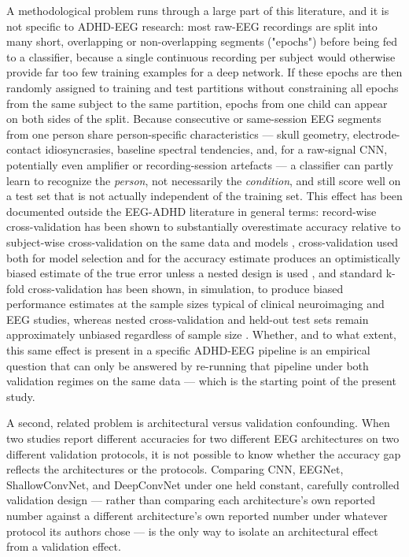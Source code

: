 \documentclass[a4paper,fleqn]{cas-sc}
\begin{document}
A methodological problem runs through a large part of this literature, and it is not specific to ADHD-EEG research: most raw-EEG recordings are split into many short, overlapping or non-overlapping segments ("epochs") before being fed to a classifier, because a single continuous recording per subject would otherwise provide far too few training examples for a deep network. If these epochs are then randomly assigned to training and test partitions without constraining all epochs from the same subject to the same partition, epochs from one child can appear on both sides of the split. Because consecutive or same-session EEG segments from one person share person-specific characteristics --- skull geometry, electrode-contact idiosyncrasies, baseline spectral tendencies, and, for a raw-signal CNN, potentially even amplifier or recording-session artefacts --- a classifier can partly learn to recognize the \textit{person}, not necessarily the \textit{condition}, and still score well on a test set that is not actually independent of the training set. This effect has been documented outside the EEG-ADHD literature in general terms: record-wise cross-validation has been shown to substantially overestimate accuracy relative to subject-wise cross-validation on the same data and models \cite{saeb2017need}, cross-validation used both for model selection and for the accuracy estimate produces an optimistically biased estimate of the true error unless a nested design is used \cite{varma2006bias}, and standard k-fold cross-validation has been shown, in simulation, to produce biased performance estimates at the sample sizes typical of clinical neuroimaging and EEG studies, whereas nested cross-validation and held-out test sets remain approximately unbiased regardless of sample size \cite{vabalas2019machine}. Whether, and to what extent, this same effect is present in a specific ADHD-EEG pipeline is an empirical question that can only be answered by re-running that pipeline under both validation regimes on the same data --- which is the starting point of the present study.



A second, related problem is architectural versus validation confounding. When two studies report different accuracies for two different EEG architectures on two different validation protocols, it is not possible to know whether the accuracy gap reflects the architectures or the protocols. Comparing CNN, EEGNet, ShallowConvNet, and DeepConvNet under one held constant, carefully controlled validation design --- rather than comparing each architecture's own reported number against a different architecture's own reported number under whatever protocol its authors chose --- is the only way to isolate an architectural effect from a validation effect.
\end{document}

